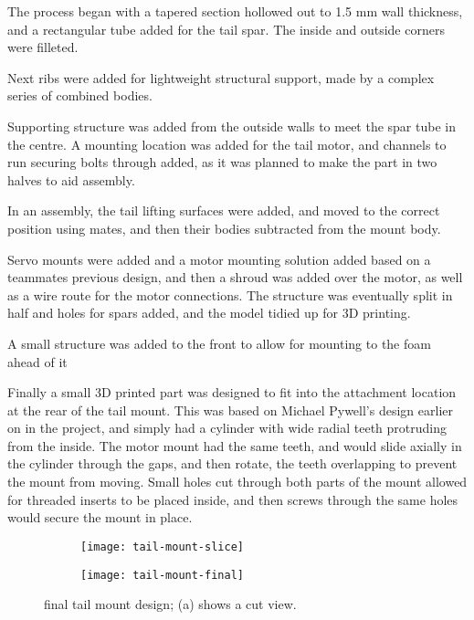 \documentclass[../../main.tex]{subfiles}
\begin{document}
The process began with a tapered section hollowed out to 1.5 mm wall thickness, and a rectangular tube added for the tail spar.
The inside and outside corners were filleted. 

Next ribs were added for lightweight structural support, made by a complex series of combined bodies.  

Supporting structure was added from the outside walls to meet the spar tube in the centre.
A mounting location was added for the tail motor, and channels to run securing bolts through added, as it was planned to make the part in two halves to aid assembly.  

In an assembly, the tail lifting surfaces were added, and moved to the correct position using mates, and then their bodies subtracted from the mount body. 

Servo mounts were added and a motor mounting solution added based on a teammates previous design, and then a shroud was added over the motor, as well as a wire route for the motor connections.
The structure was eventually split in half and holes for spars added, and the model tidied up for 3D printing. 

A small structure was added to the front to allow for mounting to the foam ahead of it 

Finally a small 3D printed part was designed to fit into the attachment location at the rear of the tail mount.
This was based on Michael Pywell’s design earlier on in the project, and simply had a cylinder with wide radial teeth protruding from the inside.
The motor mount had the same teeth, and would slide axially in the cylinder through the gaps, and then rotate, the teeth overlapping to prevent the mount from moving.
Small holes cut through both parts of the mount allowed for threaded inserts to be placed inside, and then screws through the same holes would secure the mount in place. 


\begin{figure}[H]
    \centering
    \begin{subfigure}[b]{0.49\columnwidth}
        \centering
        \texttt{[image: tail-mount-slice]}
        \caption{}
        \label{fig:tail-mount-design:slice}
    \end{subfigure}
    \hfill
    \begin{subfigure}[b]{0.49\columnwidth}
        \centering
        \texttt{[image: tail-mount-final]}
        \caption{}
        \label{fig:tail-mount-design:whole}
    \end{subfigure}
    
    \caption{final tail mount design; (a) shows a cut view.}
    \label{fig:tail-mount-design}
\end{figure} 
\end{document}

